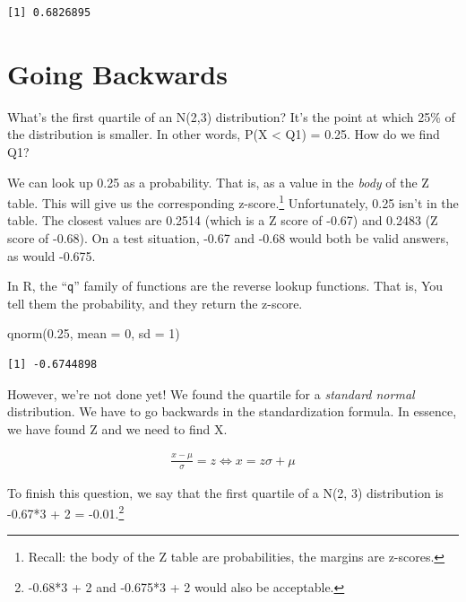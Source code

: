 \documentclass[
  letterpaper,
  DIV=11,
  numbers=noendperiod]{scrreprt}
\newenvironment{Shaded}{\begin{snugshade}}{\end{snugshade}}
\newcommand{\AttributeTok}[1]{\textcolor[rgb]{0.40,0.45,0.13}{#1}}
\newcommand{\DecValTok}[1]{\textcolor[rgb]{0.68,0.00,0.00}{#1}}
\newcommand{\FloatTok}[1]{\textcolor[rgb]{0.68,0.00,0.00}{#1}}
\newcommand{\FunctionTok}[1]{\textcolor[rgb]{0.28,0.35,0.67}{#1}}
\newcommand{\NormalTok}[1]{\textcolor[rgb]{0.00,0.23,0.31}{#1}}
\begin{document}
\begin{verbatim}
[1] 0.6826895
\end{verbatim}

\hypertarget{going-backwards}{%
\section{Going Backwards}\label{going-backwards}}

What's the first quartile of an N(2,3) distribution? It's the point at
which 25\% of the distribution is smaller. In other words, P(X
\textless{} Q1) = 0.25. How do we find Q1?

We can look up 0.25 as a probability. That is, as a value in the
\emph{body} of the Z table. This will give us the corresponding
z-score.\footnote{Recall: the body of the Z table are probabilities, the
  margins are z-scores.} Unfortunately, 0.25 isn't in the table. The
closest values are 0.2514 (which is a Z score of -0.67) and 0.2483 (Z
score of -0.68). On a test situation, -0.67 and -0.68 would both be
valid answers, as would -0.675.

In R, the ``\texttt{q}'' family of functions are the reverse lookup
functions. That is, You tell them the probability, and they return the
z-score.

\begin{Shaded}
\begin{Highlighting}[]
\FunctionTok{qnorm}\NormalTok{(}\FloatTok{0.25}\NormalTok{, }\AttributeTok{mean =} \DecValTok{0}\NormalTok{, }\AttributeTok{sd =} \DecValTok{1}\NormalTok{)}
\end{Highlighting}
\end{Shaded}

\begin{verbatim}
[1] -0.6744898
\end{verbatim}

However, we're not done yet! We found the quartile for a \emph{standard
normal} distribution. We have to go backwards in the standardization
formula. In essence, we have found Z and we need to find X.

\begin{align*}
\frac{x - \mu}{\sigma} = z \Leftrightarrow x = z\sigma + \mu
\end{align*}

To finish this question, we say that the first quartile of a N(2, 3)
distribution is -0.67*3 + 2 = -0.01.\footnote{-0.68*3 + 2 and -0.675*3 +
  2 would also be acceptable.}
\end{document}
